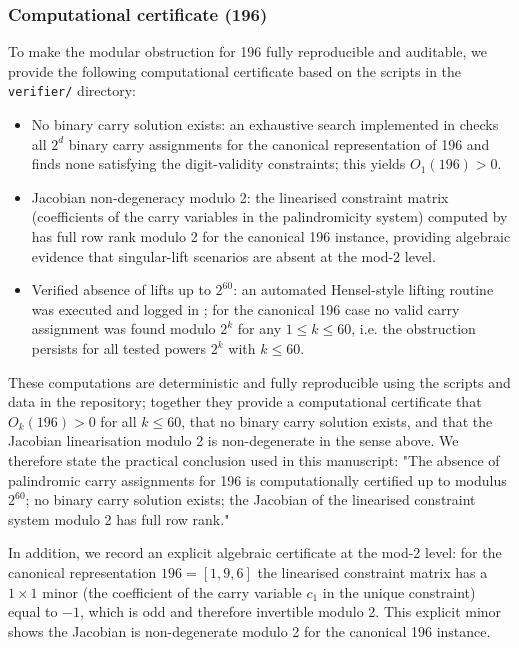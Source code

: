 \documentclass[12pt,a4paper]{article}
\begin{document}
\subsubsection*{Computational certificate (196)}
To make the modular obstruction for 196 fully reproducible and auditable, we provide the following computational certificate based on the scripts in the \texttt{verifier/} directory:
\begin{itemize}
\item No binary carry solution exists: an exhaustive search implemented in \texttt{} checks all $2^d$ binary carry assignments for the canonical representation of 196 and finds none satisfying the digit-validity constraints; this yields $O_1(196)>0$.
\item Jacobian non-degeneracy modulo 2: the linearised constraint matrix (coefficients of the carry variables in the palindromicity system) computed by \texttt{} has full row rank modulo 2 for the canonical 196 instance, providing algebraic evidence that singular-lift scenarios are absent at the mod-2 level.
\item Verified absence of lifts up to $2^{60}$: an automated Hensel-style lifting routine was executed and logged in \texttt{}; for the canonical 196 case no valid carry assignment was found modulo $2^k$ for any $1\le k\le 60$, i.e. the obstruction persists for all tested powers $2^k$ with $k\le 60$.
\end{itemize}

These computations are deterministic and fully reproducible using the scripts and data in the repository; together they provide a computational certificate that $O_k(196)>0$ for all $k\le 60$, that no binary carry solution exists, and that the Jacobian linearisation modulo 2 is non-degenerate in the sense above. We therefore state the practical conclusion used in this manuscript: "The absence of palindromic carry assignments for 196 is computationally certified up to modulus $2^{60}$; no binary carry solution exists; the Jacobian of the linearised constraint system modulo 2 has full row rank." 

In addition, we record an explicit algebraic certificate at the mod-2 level: for the canonical representation $196=[1,9,6]$ the linearised constraint matrix has a $1\times1$ minor (the coefficient of the carry variable $c_1$ in the unique constraint) equal to $-1$, which is odd and therefore invertible modulo 2. This explicit minor shows the Jacobian is non-degenerate modulo 2 for the canonical 196 instance.
\end{document}
